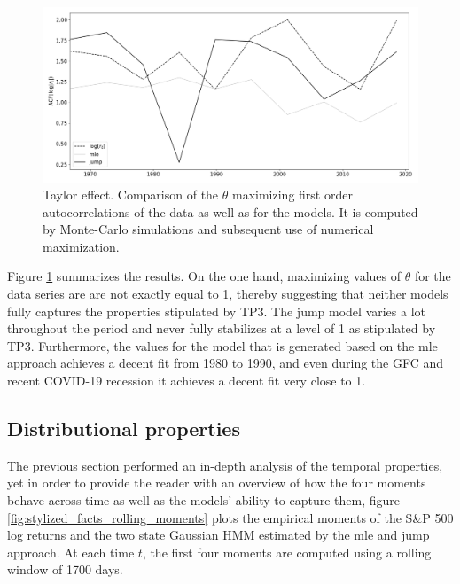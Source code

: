 \begin{figure}[H] 
    \centering
    \includegraphics[width=1.0\textwidth]{analysis/stylized_facts/images/acf_taylor_effect.png}
    \caption{Taylor effect. Comparison of the $\theta$ maximizing first order autocorrelations of the data as well as for the models. It is computed by Monte-Carlo simulations and subsequent use of numerical maximization.}
    \label{fig:stylized_facts_taylor_effect} 
\end{figure}

Figure \ref{fig:stylized_facts_taylor_effect} summarizes the results. On the
one hand, maximizing values of $\theta$ for the data series are are not exactly equal to 1, thereby suggesting that neither models fully captures the properties stipulated by TP3. The jump model varies a lot throughout the period and never fully stabilizes at a level of 1 as stipulated by TP3. Furthermore, the values for the model that is generated based on the mle approach achieves a decent fit from 1980 to 1990, and even during the GFC and recent COVID-19 recession it achieves a decent fit very close to 1.


\subsection{Distributional properties}
\label{Sec: Distributional properties}
The previous section performed an in-depth analysis of the temporal properties, yet in order to provide the reader with an overview of how the four moments behave across time as well as the models' ability to capture them, figure \ref{fig:stylized_facts_rolling_moments} plots the empirical moments of the S\&P 500 log returns and the two state Gaussian HMM estimated by the mle and jump approach. At each time $t$, the first four moments are computed using a rolling window of 1700 days.

